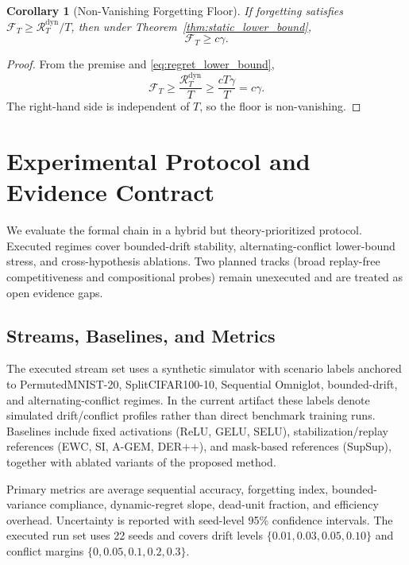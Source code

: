 \documentclass{article} %
\newtheorem{corollary}{Corollary}[theorem]
\begin{document}
\begin{corollary}[Non-Vanishing Forgetting Floor]
\label{cor:forgetting_floor}
If forgetting satisfies $\mathcal{F}_T\ge \mathcal{R}_T^{\mathrm{dyn}}/T$, then under Theorem~\ref{thm:static_lower_bound},
\begin{equation}
\mathcal{F}_T\ge c\gamma.
\label{eq:forgetting_floor_bound}
\end{equation}
\end{corollary}

\begin{proof}
From the premise and \eqref{eq:regret_lower_bound},
\[
\mathcal{F}_T\ge \frac{\mathcal{R}_T^{\mathrm{dyn}}}{T}\ge \frac{cT\gamma}{T}=c\gamma.
\]
The right-hand side is independent of $T$, so the floor is non-vanishing.
\end{proof}

\section{Experimental Protocol and Evidence Contract}
We evaluate the formal chain in a hybrid but theory-prioritized protocol. Executed regimes cover bounded-drift stability, alternating-conflict lower-bound stress, and cross-hypothesis ablations. Two planned tracks (broad replay-free competitiveness and compositional probes) remain unexecuted and are treated as open evidence gaps.

\subsection{Streams, Baselines, and Metrics}
The executed stream set uses a synthetic simulator with scenario labels anchored to PermutedMNIST-20, SplitCIFAR100-10, Sequential Omniglot, bounded-drift, and alternating-conflict regimes. In the current artifact these labels denote simulated drift/conflict profiles rather than direct benchmark training runs. Baselines include fixed activations (ReLU, GELU, SELU), stabilization/replay references (EWC, SI, A-GEM, DER++), and mask-based references (SupSup), together with ablated variants of the proposed method.

Primary metrics are average sequential accuracy, forgetting index, bounded-variance compliance, dynamic-regret slope, dead-unit fraction, and efficiency overhead. Uncertainty is reported with seed-level 95\% confidence intervals. The executed run set uses 22 seeds and covers drift levels $\{0.01,0.03,0.05,0.10\}$ and conflict margins $\{0,0.05,0.1,0.2,0.3\}$.
\end{document}
